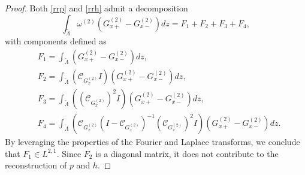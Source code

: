 \documentclass[10pt,a4paper]{amsart}
\begin{document}
\begin{proof}
Both \eqref{rrp} and \eqref{rrh} admit a decomposition
\begin{equation}\label{sgb}
\int_{\widetilde{\Lambda}}\omega^{(2)}\left(G^{(2)}_{x+}-G^{(2)}_{x-}\right)dz=F_{1}+F_{2}+F_{3}+F_{4},
\end{equation}
 with components defined as
\begin{equation*}
\begin{aligned}
&F_{1}=\int_{\widetilde{\Lambda}}\left(G^{(2)}_{x+}-G^{(2)}_{x-}\right)dz,\\
&F_{2}=\int_{\widetilde{\Lambda}}\left(\mathcal{C}_{G^{(2)}_{x}}I\right)\left(G^{(2)}_{x+}-G^{(2)}_{x-}\right)dz,\\
&F_{3}=\int_{\widetilde{\Lambda}}\left(\left(\mathcal{C}_{G^{(2)}_{x}}\right)^{2}I\right)\left(G^{(2)}_{x+}-G^{(2)}_{x-}\right)dz,\\
&F_{4}=\int_{\widetilde{\Lambda}}\left(\mathcal{C}_{G^{(2)}_{x}}\left(I-\mathcal{C}_{G^{(2)}_{x}}\right)^{-1}\left(\mathcal{C}_{G^{(2)}_{x}}\right)^{2}I\right)\left(G^{(2)}_{x+}-G^{(2)}_{x-}\right)dz.
\end{aligned}
\end{equation*}
By leveraging the properties of the Fourier and Laplace transforms, we conclude that $F_{1}\in L^{2,1}$. Since $F_{2}$ is a diagonal matrix, it does not contribute to the reconstruction of $p$ and $h$.


\end{proof}
\end{document}
